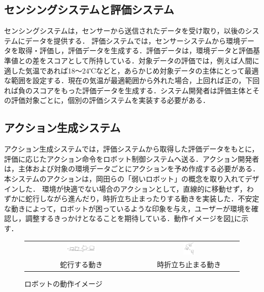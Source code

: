 \documentclass[paper=a4paper,jafontsize=9pt,head_space=15mm,gutter=20mm,
twocolumn,number_of_lines=49, line_length=26zw]{myuarticle}
\begin{document}
\subsection{センシングシステムと評価システム}
センシングシステムは，センサーから送信されたデータを受け取り，以後のシステムにデータを提供する．
評価システムでは，センサーシステムから環境データを取得・評価し，評価データを生成する．評価データは，環境データと評価基準値との差をスコアとして所持している．対象データの評価では，例えば人間に適した気温であれば18～24℃などと，あらかじめ対象データの主体にとって最適な範囲を設定する．現在の気温が最適範囲から外れた場合，上回れば正の，下回れば負のスコアをもった評価データを生成する．システム開発者は評価主体とその評価対象ごとに，個別の評価システムを実装する必要がある．

\subsection{アクション生成システム}
アクション生成システムでは，評価システムから取得した評価データをもとに，評価に応じたアクション命令をロボット制御システムへ送る．アクション開発者は，主体および対象の環境データごとにアクションを予め作成する必要がある．本システムのアクションは，岡田ら\cite{岡田-2017-弱いロボ}の「弱いロボット」の概念を取り入れてデザインした．
環境が快適でない場合のアクションとして，直線的に移動せず，わずかに蛇行しながら進んだり，時折立ち止まったりする動きを実装した．不安定な動きによって，ロボットが困っているような印象を与え，ユーザーが環境を確認し，調整するきっかけとなることを期待している．動作イメージを図\ref{fig:action-image}に示す．

\begin{figure}[h]
  \centering
  \begin{tabular}{cc}
    \includegraphics[width=0.27\textwidth]{resources/action-image-2.png} &
    \includegraphics[width=0.12\textwidth]{resources/action-image-1.png} \\
    蛇行する動き & 時折立ち止まる動き
  \end{tabular}
  \caption{ロボットの動作イメージ}
  \label{fig:action-image}
\end{figure}
\end{document}
